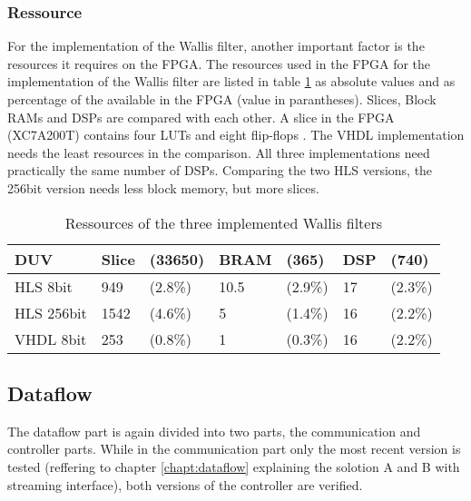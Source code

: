 \subsubsection*{Ressource} \label{ch:ver:ip:ressource}
For the implementation of the Wallis filter, another important factor is the
resources it requires on the FPGA. The resources used in the FPGA for the
implementation of the Wallis filter are listed in table \ref{tab:ressource} as
absolute values and as percentage of the available in the FPGA (value in
parantheses).
Slices, Block RAMs and DSPs are compared with each other. A slice in the FPGA 
(XC7A200T) contains four LUTs and eight flip-flops \cite{ds180}.
The VHDL implementation needs the least resources in the comparison. All
three implementations need practically the same number of DSPs. Comparing
the two HLS versions, the 256bit version needs less block memory, but more
slices.

\begin{table}[tb!]
    \centering
    \begin{tabular}{l l l l l l l}
        \toprule
        DUV         & Slice & (33650) & BRAM & (365) & DSP & (740) \\
        \midrule
        HLS  8bit    & 949 & (2.8\%)   & 10.5 & (2.9\%)  & 17 & (2.3\%) \\
        HLS  256bit  & 1542 & (4.6\%)  & 5 & (1.4\%)     & 16 & (2.2\%) \\
        VHDL 8bit       & 253 & (0.8\%)   & 1 & (0.3\%)     & 16 & (2.2\%) \\
        \bottomrule
    \end{tabular}
    \caption{Ressources of the three implemented Wallis filters}
    \label{tab:ressource}
\end{table}


%
%
\subsection{Dataflow}\label{ch:verification:dataflow}
The dataflow part is again divided into two parts, the communication and
controller parts. While in the communication part only the most recent version
is tested (reffering to chapter \ref{chapt:dataflow} explaining the solotion
A and B with streaming interface), both versions of the controller are verified.

